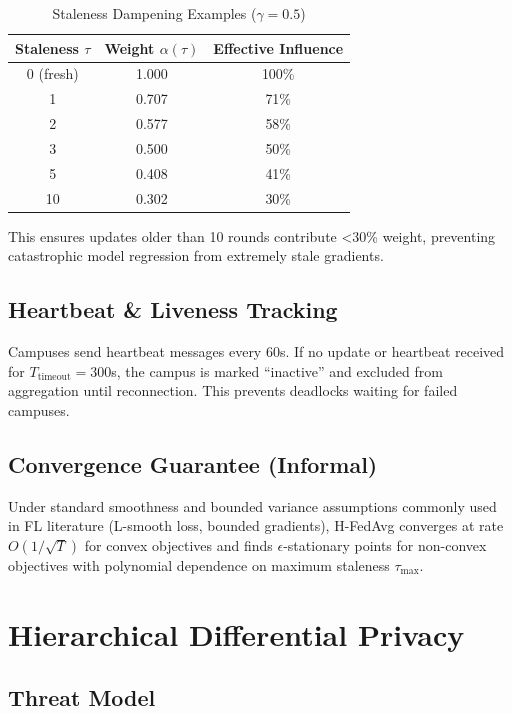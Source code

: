 \documentclass[conference]{IEEEtran}
\begin{document}
\begin{table}[h]
\centering
\caption{Staleness Dampening Examples ($\gamma=0.5$)}
\label{tab:staleness_weights}
\begin{tabular}{ccc}
\toprule
\textbf{Staleness $\tau$} & \textbf{Weight $\alpha(\tau)$} & \textbf{Effective Influence} \\
\midrule
0 (fresh) & 1.000 & 100\% \\
1 & 0.707 & 71\% \\
2 & 0.577 & 58\% \\
3 & 0.500 & 50\% \\
5 & 0.408 & 41\% \\
10 & 0.302 & 30\% \\
\bottomrule
\end{tabular}
\end{table}

This ensures updates older than 10 rounds contribute <30\% weight, preventing catastrophic model regression from extremely stale gradients.

\subsection{Heartbeat \& Liveness Tracking}

Campuses send heartbeat messages every 60s. If no update or heartbeat received for $T_{\text{timeout}} = 300$s, the campus is marked ``inactive'' and excluded from aggregation until reconnection. This prevents deadlocks waiting for failed campuses.

\subsection{Convergence Guarantee (Informal)}

Under standard smoothness and bounded variance assumptions commonly used in FL literature (L-smooth loss, bounded gradients), H-FedAvg converges at rate $O(1/\sqrt{T})$ for convex objectives and finds $\epsilon$-stationary points for non-convex objectives with polynomial dependence on maximum staleness $\tau_{\max}$.

\section{Hierarchical Differential Privacy}

\subsection{Threat Model}
\end{document}

